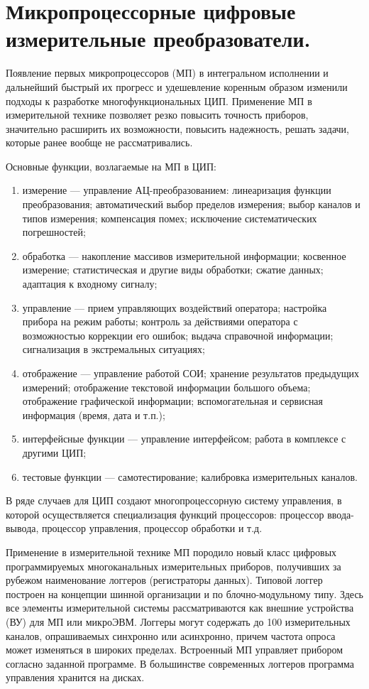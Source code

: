 \documentclass[unicode, 12pt, a4paper, oneside]{article}
\begin{document}
\section{Микропроцессорные цифровые измерительные преобразователи.}

Появление первых микропроцессоров (МП) в интегральном исполнении и дальнейший быстрый их прогресс и удешевление коренным образом изменили подходы к разработке многофункциональных ЦИП. Применение МП в измерительной технике позволяет резко повысить точность приборов, значительно расширить их возможности, повысить надежность, решать задачи, которые ранее вообще не рассматривались.

Основные функции, возлагаемые на МП в ЦИП:
\begin{enumerate}
\item измерение — управление АЦ-преобразованием: линеаризация функции преобразования; автоматический выбор пределов измерения; выбор каналов и типов измерения; компенсация помех; исключение систематических погрешностей;
\item обработка — накопление массивов измерительной информации; косвенное измерение; статистическая и другие виды обработки; сжатие данных; адаптация к входному сигналу;
\item управление — прием управляющих воздействий оператора; настройка прибора на режим работы; контроль за действиями оператора с возможностью коррекции его ошибок; выдача справочной информации; сигнализация в экстремальных ситуациях;
\item отображение — управление работой СОИ; хранение результатов предыдущих измерений; отображение текстовой информации большого объема; отображение графической информации; вспомогательная и сервисная информация (время, дата и т.п.);
\item интерфейсные функции — управление интерфейсом; работа в комплексе с другими ЦИП;
\item тестовые функции — самотестирование; калибровка измерительных каналов.
\end{enumerate}

В ряде случаев для ЦИП создают многопроцессорную систему управления, в которой осуществляется специализация функций процессоров: процессор ввода-вывода, процессор управления, процессор обработки и т.д.

Применение в измерительной технике МП породило новый класс цифровых программируемых многоканальных измерительных приборов, получивших за рубежом наименование логгеров (регистраторы данных). Типовой логгер построен на концепции шинной организации и по блочно-модульному типу. Здесь все элементы измерительной системы рассматриваются как внешние устройства (ВУ) для МП или микроЭВМ. Логгеры могут содержать до 100 измерительных каналов, опрашиваемых синхронно или асинхронно, причем частота опроса может изменяться в широких пределах. Встроенный МП управляет прибором согласно заданной программе. В большинстве современных логгеров программа управления хранится на дисках.
\end{document}
